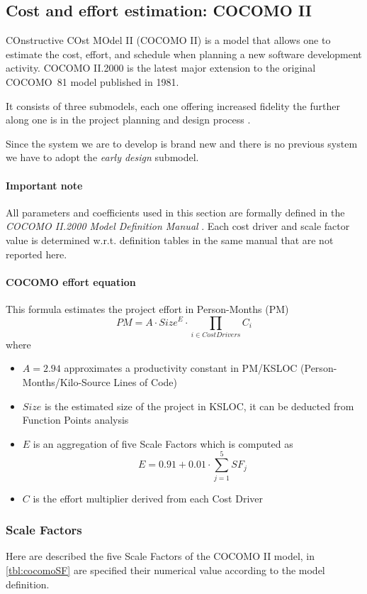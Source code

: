 \subsection{Cost and effort estimation: COCOMO II} 
COnstructive COst MOdel II (COCOMO II) is a model that allows one to estimate the cost, effort, and schedule when planning a new software development activity. COCOMO II.2000 is the latest major extension to the original \mbox{COCOMO 81} model published in 1981.

It consists of three submodels, each one offering increased fidelity the further along one is in the project planning and design process \cite{COCOMO}.

Since the system we are to develop is brand new and there is no previous system we have to adopt the \emph{early design} submodel.

\paragraph{Important note}All parameters and coefficients used in this section are formally defined in the \emph{COCOMO II.2000 Model Definition Manual} \cite{COCOMOManual}. Each cost driver and scale factor value is determined w.r.t. definition tables in the same manual that are not reported here.

\paragraph{COCOMO effort equation}\label{par:cocomoEquation}This formula estimates the project effort in Person-Months (PM)
$$PM = A \cdot Size^{E} \cdot \prod_{i \in CostDrivers}C_{i}$$
where 
\begin{itemize}
	\item $A=2.94$ approximates a productivity constant in PM/KSLOC (Person-Months/Kilo-Source Lines of Code)
	\item $Size$ is the estimated size of the project in KSLOC, it can be deducted from Function Points analysis
	\item $E$ is an aggregation of five Scale Factors which is computed as $$E = 0.91 + 0.01 \cdot \sum_{j=1}^{5}{SF_j}$$
	\item $C$ is the effort multiplier derived from each Cost Driver
\end{itemize}

\clearpage

\subsubsection{Scale Factors}
Here are described the five Scale Factors of the COCOMO II model, in \autoref{tbl:cocomoSF} are specified their numerical value according to the model definition.
 
